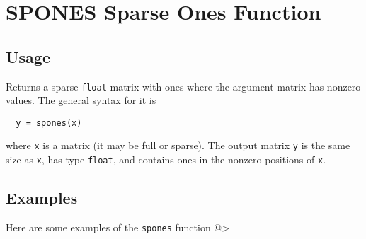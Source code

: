 \section{SPONES Sparse Ones Function}

\subsection{Usage}

Returns a sparse \verb|float| matrix with ones where the argument
matrix has nonzero values.  The general syntax for it is
\begin{verbatim}
  y = spones(x)
\end{verbatim}
where \verb|x| is a matrix (it may be full or sparse).  The output
matrix \verb|y| is the same size as \verb|x|, has type \verb|float|, and contains
ones in the nonzero positions of \verb|x|.
\subsection{Examples}

Here are some examples of the \verb|spones| function
@>
